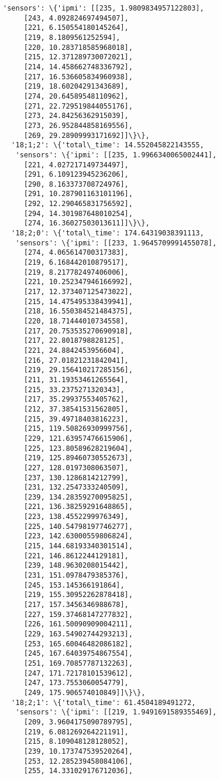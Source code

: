\documentclass[11pt]{article}
\begin{document}
\begin{tcolorbox}[breakable, size=fbox, boxrule=.5pt, pad at break*=1mm, opacityfill=0]
\begin{Verbatim}[commandchars=\\\{\}]
   'sensors': \{'ipmi': [[235, 1.9809834957122803],
     [243, 4.092824697494507],
     [221, 6.150554180145264],
     [219, 8.1809561252594],
     [220, 10.283718585968018],
     [215, 12.371289730072021],
     [214, 14.458662748336792],
     [217, 16.536605834960938],
     [219, 18.60204291343689],
     [274, 20.64589548110962],
     [271, 22.729519844055176],
     [273, 24.84256362915039],
     [273, 26.952844858169556],
     [269, 29.28909993171692]]\}\},
  '18;1;2': \{'total\_time': 14.552045822143555,
   'sensors': \{'ipmi': [[235, 1.9966340065002441],
     [221, 4.027217149734497],
     [291, 6.109123945236206],
     [290, 8.163373708724976],
     [291, 10.287901163101196],
     [292, 12.290465831756592],
     [294, 14.301987648010254],
     [274, 16.36027503013611]]\}\},
  '18;2;0': \{'total\_time': 174.64319038391113,
   'sensors': \{'ipmi': [[233, 1.9645709991455078],
     [274, 4.065614700317383],
     [219, 6.168442010879517],
     [219, 8.217782497406006],
     [221, 10.252347946166992],
     [217, 12.373407125473022],
     [215, 14.475495338439941],
     [218, 16.550384521484375],
     [220, 18.71444010734558],
     [217, 20.753535270690918],
     [217, 22.8018798828125],
     [221, 24.8842453956604],
     [216, 27.01821231842041],
     [219, 29.156410217285156],
     [211, 31.19353461265564],
     [215, 33.2375271320343],
     [217, 35.29937553405762],
     [212, 37.38541531562805],
     [215, 39.49718403816223],
     [215, 119.50826930999756],
     [229, 121.63957476615906],
     [225, 123.80589628219604],
     [219, 125.89460730552673],
     [227, 128.0197308063507],
     [237, 130.1286814212799],
     [231, 132.2547333240509],
     [239, 134.28359270095825],
     [221, 136.38259291648865],
     [223, 138.4552299976349],
     [225, 140.54798197746277],
     [223, 142.63000559806824],
     [215, 144.68193340301514],
     [221, 146.8612244129181],
     [239, 148.9630208015442],
     [231, 151.0978479385376],
     [245, 153.145366191864],
     [219, 155.30952262878418],
     [217, 157.3456346988678],
     [227, 159.37468147277832],
     [226, 161.50090909004211],
     [229, 163.54902744293213],
     [253, 165.60046482086182],
     [245, 167.64039754867554],
     [251, 169.70857787132263],
     [247, 171.72178101539612],
     [247, 173.7553060054779],
     [249, 175.906574010849]]\}\},
  '18;2;1': \{'total\_time': 61.4504189491272,
   'sensors': \{'ipmi': [[219, 1.9491691589355469],
     [209, 3.9604175090789795],
     [219, 6.081269264221191],
     [215, 8.109048128128052],
     [239, 10.173747539520264],
     [253, 12.285239458084106],
     [255, 14.331029176712036],

\end{Verbatim}
\end{tcolorbox}
\end{document}
